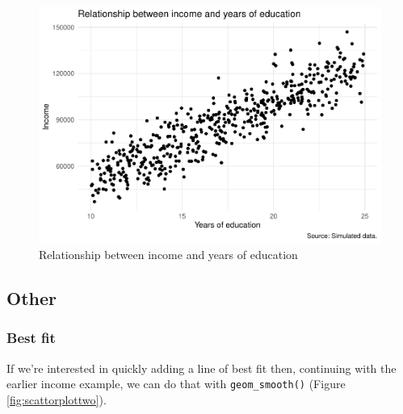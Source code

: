 \documentclass[
]{book}
\newenvironment{Shaded}{\begin{snugshade}}{\end{snugshade}}
\newcommand{\DataTypeTok}[1]{\textcolor[rgb]{0.13,0.29,0.53}{#1}}
\newcommand{\KeywordTok}[1]{\textcolor[rgb]{0.13,0.29,0.53}{\textbf{#1}}}
\newcommand{\NormalTok}[1]{#1}
\newcommand{\OperatorTok}[1]{\textcolor[rgb]{0.81,0.36,0.00}{\textbf{#1}}}
\newcommand{\StringTok}[1]{\textcolor[rgb]{0.31,0.60,0.02}{#1}}
\begin{document}
\begin{figure}
\centering
\includegraphics{telling_stories_with_data_files/figure-latex/scattorplot-1.pdf}
\caption{\label{fig:scattorplot}Relationship between income and years of education}
\end{figure}

\hypertarget{other}{%
\subsection{Other}\label{other}}

\hypertarget{best-fit}{%
\subsubsection{Best fit}\label{best-fit}}

If we're interested in quickly adding a line of best fit then, continuing with the earlier income example, we can do that with \texttt{geom\_smooth()} (Figure \ref{fig:scattorplottwo}).

\begin{Shaded}
\end{Shaded}
\end{document}
